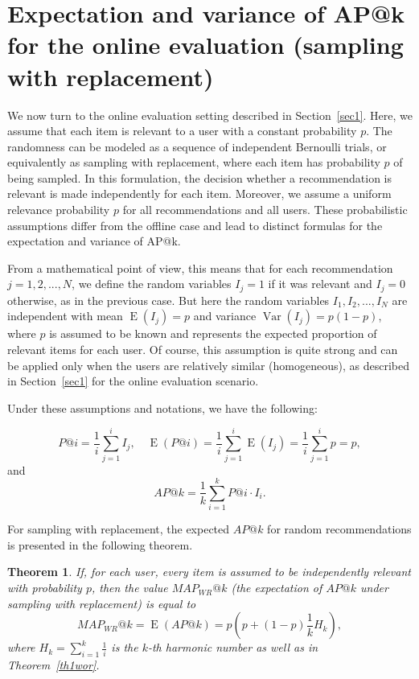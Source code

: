 \documentclass{tpms-l}
\newtheorem{theorem}{Theorem}[section]
\theoremstyle{definition}
\theoremstyle{remark}
\numberwithin{equation}{section}
\begin{document}
\section{Expectation and variance of AP@k for the online evaluation (sampling with replacement)} \label{sec4}

We now turn to the online evaluation setting described in Section~\ref{sec1}. Here, we assume that each item is relevant to a user with a constant probability $p$. The randomness can be modeled as a sequence of independent Bernoulli trials, or equivalently as sampling with replacement, where each item has probability $p$ of being sampled. In this formulation, the decision whether a recommendation is relevant is made independently for each item. Moreover, we assume a uniform relevance probability $p$ for all recommendations and all users. These probabilistic assumptions differ from the offline case and lead to distinct formulas for the expectation and variance of AP@k.
 
From a mathematical point of view, this means that for each recommendation $j=1, 2, ..., N$, we define the random variables $I_j=1$ if it was relevant and $I_j=0$ otherwise, as in the previous case. But here the random variables $I_1, I_2,..., I_N$ are independent with mean $\operatorname{E}(I_j) = p$ and variance $\operatorname{Var} (I_j) = p(1-p)$, where $p$ is assumed to be known and represents the expected proportion of relevant items for each user. Of course, this assumption is quite strong and can be applied only when the users are relatively similar (homogeneous), as described in Section~\ref{sec1} for the online evaluation scenario.

Under these assumptions and notations, we have the following:

$$P@i=\frac{1}{i}\sum_{j=1}^iI_j, \quad \operatorname{E}(P@i)=\frac{1}{i}\sum_{j=1}^i\operatorname{E} (I_j)= \frac{1}{i}\sum_{j=1}^i p=p,$$
and $$AP@k=\frac{1}{k}\sum_{i=1}^k P@i\cdot I_{i}.$$

For sampling with replacement, the expected $AP@k$ for random recommendations is presented in the following theorem. 

\begin{theorem}\label{th1wr} If, for each user, every item is assumed to be independently relevant with probability $p$, then the value $ MAP_{WR}@k $ (the expectation of $ AP@k $ under sampling with replacement) is equal to
\begin{equation}\label{eq5}
MAP_{WR}@k= \operatorname{E}(AP@k) =p\left(p+\left(1-p\right)\frac 1kH_k\right), 
\end{equation}
where $H_k=\sum_{i=1}^k\frac1i$ is the $k$-th harmonic number as well as in Theorem~\ref{th1wor}.
\end{theorem}
\end{document}
